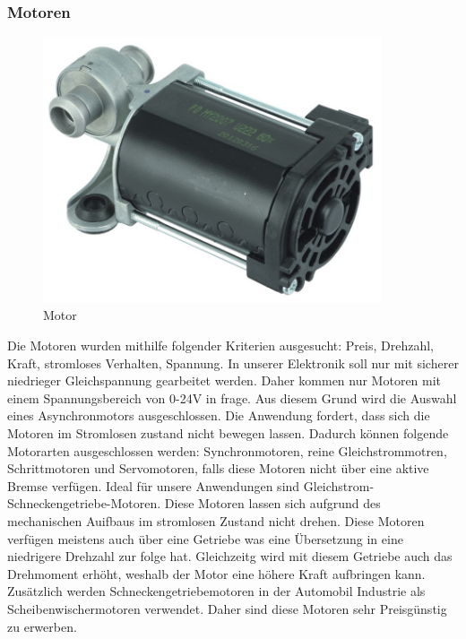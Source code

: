 \subsubsection{Motoren}
\begin{figure}[H] 
\begin{center}

\includegraphics[width=10cm]{Bilder/Bauteile/Motor}
\caption{Motor}
\label{Motor}

\end{center}
\end{figure}
Die Motoren wurden mithilfe folgender Kriterien ausgesucht: Preis, Drehzahl, Kraft, stromloses Verhalten, Spannung.
In unserer Elektronik soll nur mit sicherer niedrieger Gleichspannung gearbeitet werden. Daher kommen nur Motoren mit einem Spannungsbereich von 0-24V in frage. Aus diesem Grund wird die Auswahl eines Asynchronmotors ausgeschlossen. Die Anwendung fordert, dass sich die Motoren im Stromlosen zustand nicht bewegen lassen. Dadurch können folgende Motorarten ausgeschlossen werden: Synchronmotoren, reine Gleichstrommotren, Schrittmotoren und Servomotoren, falls diese Motoren nicht über eine aktive Bremse verfügen. Ideal für unsere Anwendungen sind Gleichstrom-Schneckengetriebe-Motoren. Diese Motoren lassen sich aufgrund des mechanischen Auifbaus im stromlosen Zustand nicht drehen. Diese Motoren verfügen meistens auch über eine Getriebe was eine Übersetzung in eine niedrigere Drehzahl zur folge hat. Gleichzeitg wird mit diesem Getriebe auch das Drehmoment erhöht, weshalb der Motor eine höhere Kraft aufbringen kann. Zusätzlich werden Schneckengetriebemotoren in der Automobil Industrie als Scheibenwischermotoren verwendet. Daher sind diese Motoren sehr Preisgünstig zu erwerben.

